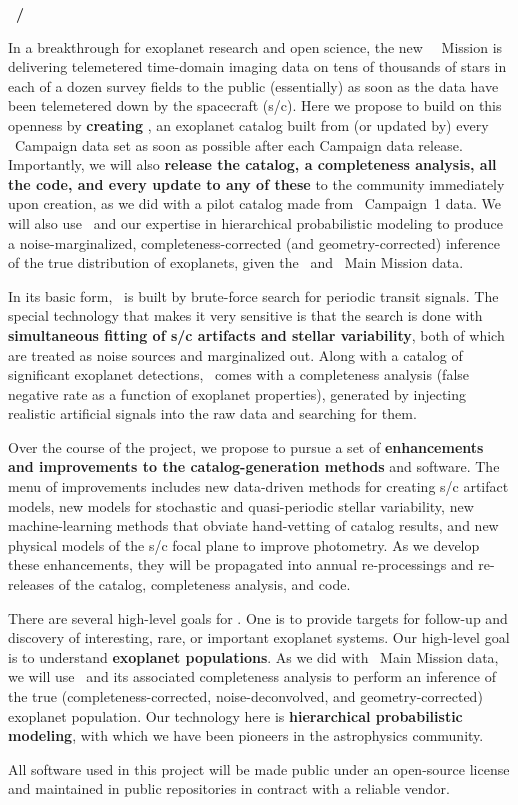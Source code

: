 \documentclass[12pt]{article}
\begin{document}
\noindent\textbf{\shortauthor~/~\fulltitle}
\bigskip

In a breakthrough for exoplanet research and open science, the new
\kepler\ \ketu\ Mission is delivering telemetered time-domain imaging
data on tens of thousands of stars in each of a dozen survey fields to
the public (essentially) as soon as the data have been telemetered
down by the spacecraft (s/c).
Here we propose to build on this openness by \textbf{creating
  \thecatalog}, an exoplanet catalog built from (or updated by)
every \ketu\ Campaign data set as soon as possible after each Campaign
data release.
Importantly, we will also \textbf{release the catalog, a completeness
  analysis, all the code, and every update to any of these} to the
community immediately upon creation, as we did with a pilot catalog
made from \ketu\ Campaign~1 data.
We will also use \thecatalog\ and our expertise in hierarchical
probabilistic modeling to produce a noise-marginalized,
completeness-corrected (and geometry-corrected) inference of the true
distribution of exoplanets, given the \ketu\ and \kepler\ Main Mission
data.

In its basic form, \thecatalog\ is built by brute-force search for
periodic transit signals.
The special technology that makes it very sensitive is that the search
is done with \textbf{simultaneous fitting of s/c artifacts and stellar
variability}, both of which are treated as noise sources and
marginalized out.
Along with a catalog of significant exoplanet detections,
\thecatalog\ comes with a completeness analysis (false negative rate
as a function of exoplanet properties), generated by injecting
realistic artificial signals into the raw data and searching for them.

Over the course of the project, we propose to pursue a set of
\textbf{enhancements and improvements to the catalog-generation methods} and
software.
The menu of improvements includes new data-driven methods for creating
s/c artifact models, new models for stochastic and quasi-periodic
stellar variability, new machine-learning methods that obviate
hand-vetting of catalog results, and new physical models of the s/c
focal plane to improve photometry.
As we develop these enhancements, they will be propagated into annual
re-processings and re-releases of the catalog, completeness analysis,
and code.

There are several high-level goals for \thecatalog.
One is to provide targets for follow-up and discovery of interesting,
rare, or important exoplanet systems.
Our high-level goal is to understand \textbf{exoplanet populations}.
As we did with \kepler\ Main Mission data, we will use
\thecatalog\ and its associated completeness analysis to perform an
inference of the true (completeness-corrected, noise-deconvolved, and
geometry-corrected) exoplanet population.
Our technology here is \textbf{hierarchical probabilistic modeling},
with which we have been pioneers in the astrophysics community.

All software used in this project will be made public under an
open-source license and maintained in public  repositories in
contract with a reliable vendor.
\end{document}
